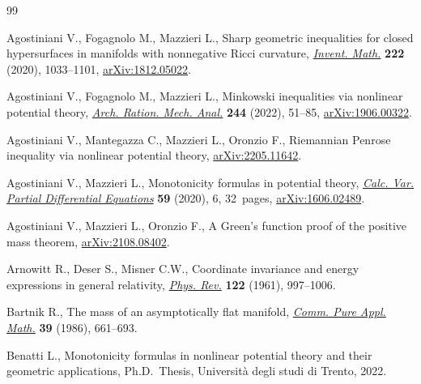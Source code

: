 \begin{thebibliography}{99}
\footnotesize\itemsep=0pt

Agostiniani V., Fogagnolo M., Mazzieri L., Sharp geometric inequalities for
 closed hypersurfaces in manifolds with nonnegative {R}icci curvature,
 \href{https://doi.org/10.1007/s00222-020-00985-4}{\textit{Invent. Math.}} \textbf{222} (2020), 1033--1101, \href{https://arxiv.org/abs/1812.05022}{arXiv:1812.05022}.

Agostiniani V., Fogagnolo M., Mazzieri L., Minkowski inequalities via nonlinear
 potential theory, \href{https://doi.org/10.1007/s00205-022-01756-6}{\textit{Arch. Ration. Mech. Anal.}} \textbf{244} (2022),
 51--85, \href{https://arxiv.org/abs/1906.00322}{arXiv:1906.00322}.

Agostiniani V., Mantegazza C., Mazzieri L., Oronzio F., Riemannian {P}enrose
 inequality via nonlinear potential theory, \href{https://arxiv.org/abs/2205.11642}{arXiv:2205.11642}.

Agostiniani V., Mazzieri L., Monotonicity formulas in potential theory,
 \href{https://doi.org/10.1007/s00526-019-1665-2}{\textit{Calc. Var. Partial Differential Equations}} \textbf{59} (2020), 6,
 32~pages, \href{https://arxiv.org/abs/1606.02489}{arXiv:1606.02489}.

Agostiniani V., Mazzieri L., Oronzio F., A {G}reen's function proof of the
 positive mass theorem, \href{https://arxiv.org/abs/2108.08402}{arXiv:2108.08402}.

Arnowitt R., Deser S., Misner C.W., Coordinate invariance and energy
 expressions in general relativity, \href{https://doi.org/10.1103/PhysRev.122.997}{\textit{Phys. Rev.}} \textbf{122} (1961),
 997--1006.

Bartnik R., The mass of an asymptotically flat manifold, \href{https://doi.org/10.1002/cpa.3160390505}{\textit{Comm. Pure
 Appl. Math.}} \textbf{39} (1986), 661--693.

Benatti L., Monotonicity formulas in nonlinear potential theory and their
 geometric applications, Ph.D.~Thesis, {U}niversit\`a degli studi di Trento,
 2022.


\end{thebibliography}
